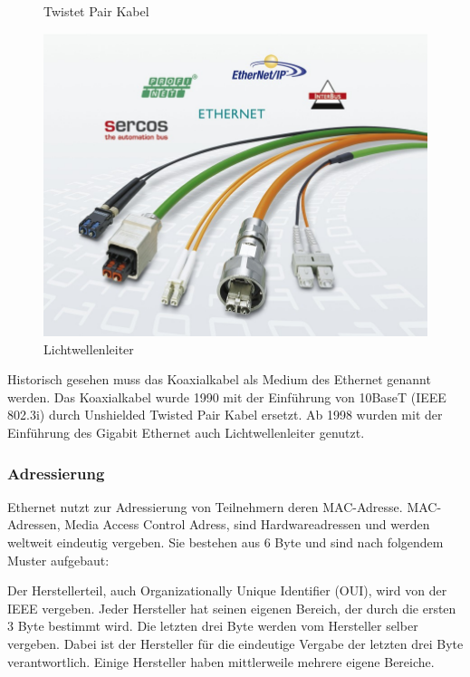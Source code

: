 \documentclass[12pt, a4paper, ngerman]{article}
\begin{document}
\begin{figure}[H]
\begin{minipage}[hbt]{.28\linewidth}
	\caption{Twistet Pair Kabel \cite{tw_kabel}}
	\label{twkabel}
\end{minipage}
\hfill
\begin{minipage}[hbt]{.28\linewidth}
	\centering
	\includegraphics[width=0.9\linewidth]{Grafiken/lwl_leiter.jpg}
	\caption{Lichtwellenleiter \cite{lwl_leiter}}
	\label{lwlleiter}
\end{minipage}
\end{figure}
 
Historisch gesehen muss das Koaxialkabel als Medium des Ethernet genannt werden. Das Koaxialkabel wurde 1990 mit der Einführung von 10BaseT (IEEE 802.3i) durch Unshielded Twisted Pair Kabel ersetzt. Ab 1998 wurden mit der Einführung des Gigabit Ethernet auch Lichtwellenleiter genutzt. 

\subsubsection{Adressierung \label{ethernet_adresse}}
 Ethernet nutzt zur Adressierung von Teilnehmern deren MAC-Adresse. MAC-Adressen, Media Access Control Adress, sind Hardwareadressen und werden weltweit eindeutig vergeben. Sie bestehen aus 6 Byte und sind nach folgendem Muster aufgebaut: 
 

Der Herstellerteil, auch Organizationally  Unique Identifier (OUI), wird von der IEEE vergeben. Jeder Hersteller hat seinen eigenen Bereich, der durch die ersten 3 Byte bestimmt wird. Die letzten drei Byte werden vom Hersteller selber vergeben. Dabei ist der Hersteller für die eindeutige Vergabe der letzten drei Byte verantwortlich. Einige Hersteller haben mittlerweile mehrere eigene Bereiche.
\end{document}
